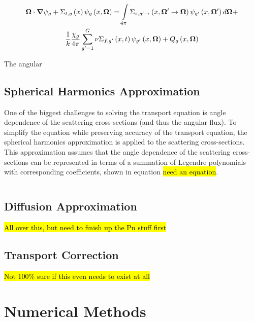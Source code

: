 \begin{gather}\label{e:multigroupboltzmann}
\bm \Omega \cdot \bm \nabla \psi_g + \Sigma_{t,g}\left(x\right)\psi_g\left(x,\bm \Omega\right) = \intop_{4\pi} \Sigma_{s,g'\rightarrow}\left(x,\bm \Omega' \rightarrow \bm \Omega\right) \psi_{g'}\left(x,\bm \Omega'\right) d\bm \Omega + \nonumber\\
\frac{1}{k}\frac{\chi_g}{4\pi} \sum_{g'=1}^{G} \nu \Sigma_{f,g'}\left(x,t\right) \psi_{g'}\left(x,\bm \Omega\right) + Q_g\left(x,\bm \Omega\right)
\end{gather}

The angular 

\subsection{Spherical Harmonics Approximation}

One of the biggest challenges to solving the transport equation is angle dependence of the scattering cross-sections (and thus the angular flux).  To simplify the equation while preserving accuracy of the transport equation, the spherical harmonics approximation is applied to the scattering cross-sections.  This approximation assumes that the angle dependence of the scattering cross-sections can be represented in terms of a summation of Legendre polynomials with corresponding coefficients, shown in equation \hl{need an equation}.

\begin{equation}\label{e:sphericalHarmonicsXSExpansion}
\end{equation}

\subsection{Diffusion Approximation}

\hl{All over this, but need to finish up the Pn stuff first}

\subsection{Transport Correction}

\hl{Not 100\% sure if this even needs to exist at all}

\section{Numerical Methods}



